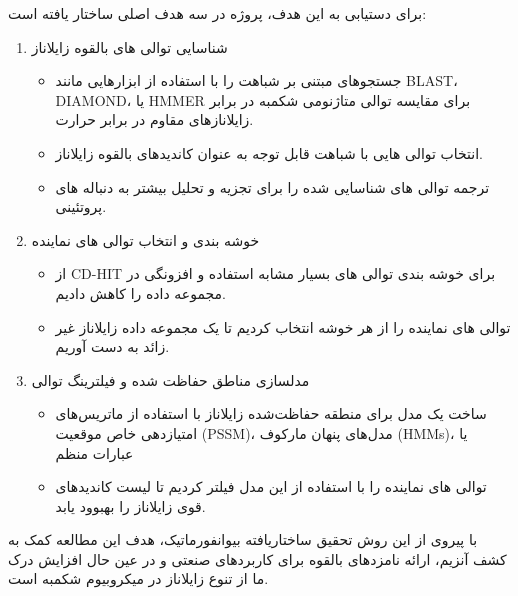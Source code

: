         برای دستیابی به این هدف، پروژه در سه هدف اصلی ساختار یافته است:
        \begin{enumerate}
            \item شناسایی توالی های بالقوه زایلاناز
                \begin{itemize}
                    \item جستجوهای مبتنی بر شباهت را با استفاده از ابزارهایی مانند 
                    BLAST، DIAMOND، یا HMMER 
                    برای مقایسه توالی متاژنومی شکمبه در برابر زایلانازهای مقاوم در برابر حرارت.
                    \item  انتخاب توالی هایی با شباهت قابل توجه به عنوان کاندیدهای بالقوه زایلاناز.
                    \item ترجمه توالی های شناسایی شده را برای تجزیه و تحلیل بیشتر به دنباله های پروتئینی.
                \end{itemize}
            \item خوشه بندی و انتخاب توالی های نماینده
                \begin{itemize}
                    \item از CD-HIT برای خوشه بندی توالی های بسیار مشابه استفاده  و افزونگی در مجموعه داده را کاهش دادیم.
                    \item توالی های نماینده را از هر خوشه انتخاب کردیم تا یک مجموعه داده زایلاناز غیر زائد به دست آوریم.
                \end{itemize}
            \item مدلسازی مناطق حفاظت شده و فیلترینگ توالی
                \begin{itemize}
                    \item  ساخت یک مدل برای منطقه حفاظت‌شده زایلاناز با استفاده از ماتریس‌های امتیازدهی خاص موقعیت 
                    (PSSM)، 
                    مدل‌های پنهان مارکوف 
                    (HMMs)، 
                    یا عبارات منظم
                    \item توالی های نماینده را با استفاده از این مدل فیلتر کردیم تا لیست کاندیدهای قوی زایلاناز را بهبوود یابد.
                \end{itemize}
        \end{enumerate}

        با پیروی از این روش تحقیق ساختاریافته بیوانفورماتیک، هدف این مطالعه کمک به کشف آنزیم، ارائه نامزدهای بالقوه برای کاربردهای صنعتی و در عین حال افزایش درک ما از تنوع زایلاناز در میکروبیوم شکمبه است.

